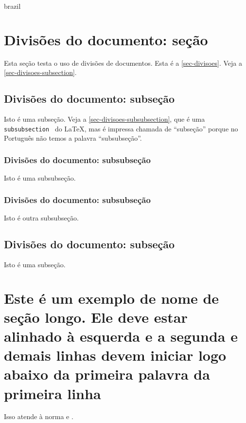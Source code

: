 \begin{otherlanguage*}{brazil}
\section{Divisões do documento: seção}\label{sec-divisoes}

Esta seção testa o uso de divisões de documentos. Esta é a
\autoref{sec-divisoes}. Veja a \autoref{sec-divisoes-subsection}.

\subsection{Divisões do documento: subseção}\label{sec-divisoes-subsection}

Isto é uma subseção. Veja a \autoref{sec-divisoes-subsubsection}, que é uma
\texttt{subsubsection  } do \LaTeX{}, mas é impressa chamada de ``subseção'' porque
no Português não temos a palavra ``subsubseção''.

 


\subsubsection{Divisões do documento: subsubseção}
\label{sec-divisoes-subsubsection}

Isto é uma subsubseção.

\subsubsection{Divisões do documento: subsubseção}

Isto é outra subsubseção.

\subsection{Divisões do documento: subseção}\label{sec-exemplo-subsec}

Isto é uma subseção.




\section[Exemplo muito longo]{Este é um exemplo de nome de seção longo. Ele deve estar
alinhado à esquerda e a segunda e demais linhas devem iniciar logo abaixo da
primeira palavra da primeira linha}

Isso atende à norma 
 e .


\end{otherlanguage*}
